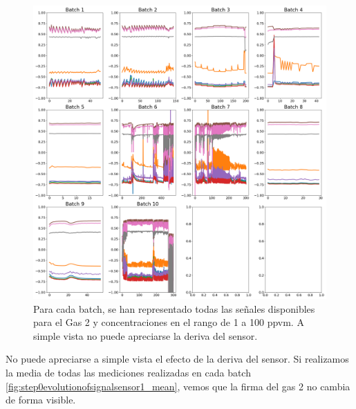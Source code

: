 \begin{figure}[h!]
	\centering
	\includegraphics[width=1\linewidth]{../py_imgs/Step0_Evolution_of_signal_sensor1}
	\caption[Señales disponibles para Gas 2, concentraciones 1-100, evolucion para cada batch]{Para cada batch, se han representado todas las señales disponibles para el Gas 2 y concentraciones en el rango de 1 a 100 ppvm. A simple vista no puede apreciarse la deriva del sensor.}
	\label{fig:step0evolutionofsignalsensor1}
\end{figure}

No puede apreciarse a simple vista el efecto de la deriva del sensor. Si realizamos la media de todas las mediciones realizadas en cada batch \ref{fig:step0evolutionofsignalsensor1_mean}, vemos que la firma del gas 2 no cambia de forma visible.

